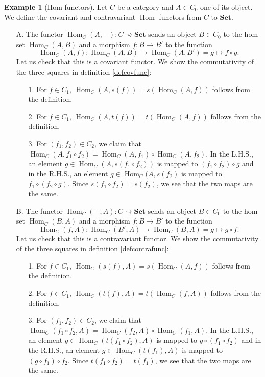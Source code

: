 \documentclass{scrartcl}
\theoremstyle{definition}
\newtheorem{exmp}[thm]{Example}
\theoremstyle{remark}
\DeclareMathOperator{\Hom}{Hom}
\begin{document}
\begin{exmp}[Hom functors]\label{homfunc}
    Let $C$ be a category and $A \in C_0$ one of its object. We define the covariant and contravariant $\Hom$ functors from $C$ to $\textbf{Set}$.
    \begin{enumerate}
        \item[A.] The functor $\Hom_C(A,-): C \rightsquigarrow \textbf{Set}$ sends an object $B\in C_0$ to the hom set $\Hom_C(A,B)$ and a morphism $f:B\rightarrow B'$ to the function $$\Hom_C(A,f): \Hom_C(A,B) \rightarrow \Hom_C(A,B') = g \mapsto f\circ g.$$ Let us check that this is a covariant functor. We show the commutativity of the three squares in definition \ref{defcovfunc}:
        \begin{enumerate}
            \item[1.] For $f \in C_1$, $\Hom_C(A,s(f)) = s(\Hom_C(A,f))$ follows from the definition.
            \item[2.] For $f \in C_1$, $\Hom_C(A,t(f)) = t(\Hom_C(A,f))$ follows from the definition.
            \item[3.] For $(f_1,f_2) \in C_2$, we claim that $\Hom_C(A,f_1\circ f_2) = \Hom_C(A,f_1)\circ \Hom_C(A,f_2)$. In the L.H.S., an element $g \in \Hom_C(A,s(f_1\circ f_2))$ is mapped to $(f_1 \circ f_2) \circ g$ and in the R.H.S., an element $g \in \Hom_C(A,s(f_2)$ is mapped to $f_1\circ (f_2 \circ g)$. Since $s(f_1 \circ f_2) = s(f_2)$, we see that the two maps are the same.
        \end{enumerate}
        \item[B.] The functor $\Hom_C(-,A): C \rightsquigarrow \textbf{Set}$ sends an object $B\in C_0$ to the hom set $\Hom_C(B,A)$ and a morphism $f:B\rightarrow B'$ to the function $$\Hom_C(f,A): \Hom_C(B',A) \rightarrow \Hom_C(B,A) = g \mapsto g\circ f.$$ Let us check that this is a contravariant functor. We show the commutativity of the three squares in definition \ref{defcontrafunc}:
        \begin{enumerate}
            \item[1.] For $f \in C_1$, $\Hom_C(s(f),A) = s(\Hom_C(A,f))$ follows from the definition.
            \item[2.] For $f \in C_1$, $\Hom_C(t(f),A) = t(\Hom_C(f,A))$ follows from the definition.
            \item[3.] For $(f_1,f_2) \in C_2$, we claim that $\Hom_C(f_1\circ f_2,A) = \Hom_C(f_2,A)\circ \Hom_C(f_1,A)$. In the L.H.S., an element $g \in \Hom_C(t(f_1\circ f_2),A)$ is mapped to $g\circ (f_1 \circ f_2)$ and in the R.H.S., an element $g \in \Hom_C(t(f_1),A)$ is mapped to $(g\circ f_1) \circ f_2$. Since $t(f_1 \circ f_2) = t(f_1)$, we see that the two maps are the same.
        \end{enumerate}
    \end{enumerate}
\end{exmp}
\end{document}
